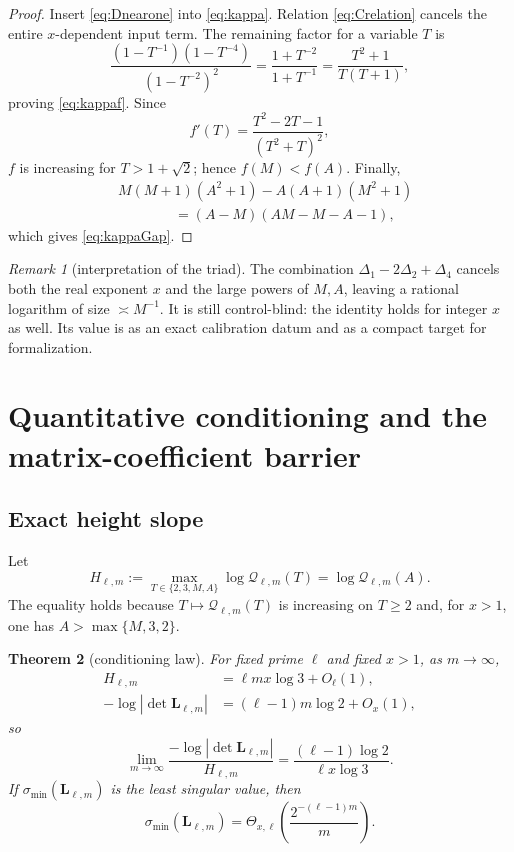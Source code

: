 \documentclass[11pt]{article}
\numberwithin{equation}{section}
\newtheorem{theorem}{Theorem}[section]
\theoremstyle{definition}
\theoremstyle{remark}
\newtheorem{remark}[theorem]{Remark}
\begin{document}
\begin{proof}
Insert \eqref{eq:Dnearone} into \eqref{eq:kappa}.  Relation \eqref{eq:Crelation} cancels the entire $x$-dependent input term.  The remaining factor for a variable $T$ is
\[
  \frac{(1-T^{-1})(1-T^{-4})}{(1-T^{-2})^2}
  =\frac{1+T^{-2}}{1+T^{-1}}
  =\frac{T^2+1}{T(T+1)},
\]
proving \eqref{eq:kappaf}.  Since
\[
  f'(T)=\frac{T^2-2T-1}{(T^2+T)^2},
\]
$f$ is increasing for $T>1+\sqrt2$; hence $f(M)<f(A)$.  Finally,
\begin{align*}
 &M(M+1)(A^2+1)-A(A+1)(M^2+1)\\
 &\hspace{4em}=(A-M)(AM-M-A-1),
\end{align*}
which gives \eqref{eq:kappaGap}.
\end{proof}

\begin{remark}[interpretation of the triad]
The combination $\Delta_1-2\Delta_2+\Delta_4$ cancels both the real exponent $x$ and the large powers of $M,A$, leaving a rational logarithm of size $\asymp M^{-1}$.  It is still control-blind: the identity holds for integer $x$ as well.  Its value is as an exact calibration datum and as a compact target for formalization.
\end{remark}

\section{Quantitative conditioning and the matrix-coefficient barrier}

\subsection{Exact height slope}

Let
\begin{equation}\label{eq:Hdef}
  H_{\ell,m}:=
  \max_{T\in\{2,3,M,A\}}\log\mathcal Q_{\ell,m}(T)
  =\log\mathcal Q_{\ell,m}(A).
\end{equation}
The equality holds because $T\mapsto\mathcal Q_{\ell,m}(T)$ is increasing on $T\ge2$ and, for $x>1$, one has $A>\max\{M,3,2\}$.

\begin{theorem}[conditioning law]\label{thm:heightlaw}
For fixed prime $\ell$ and fixed $x>1$, as $m\to\infty$,
\begin{align}
  H_{\ell,m}
  &=\ell m x\log3+O_\ell(1),\label{eq:Hasymp}\\
  -\log|\det\mathbf L_{\ell,m}|
  &=(\ell-1)m\log2+O_x(1),\label{eq:detlogasymp}
\end{align}
so
\begin{equation}\label{eq:slope}
  \lim_{m\to\infty}
  \frac{-\log|\det\mathbf L_{\ell,m}|}{H_{\ell,m}}
  =\frac{(\ell-1)\log2}{\ell x\log3}.
\end{equation}
If $\sigma_{\min}(\mathbf L_{\ell,m})$ is the least singular value, then
\begin{equation}\label{eq:singularvalue}
  \sigma_{\min}(\mathbf L_{\ell,m})
  =\Theta_{x,\ell}\!\left(\frac{2^{-(\ell-1)m}}{m}\right).
\end{equation}
\end{theorem}
\end{document}
